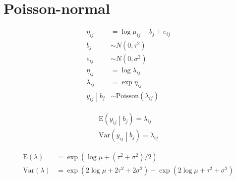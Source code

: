 \documentclass{article}
\begin{document}
\section{Poisson-normal}

\begin{align*}
\eta_{ij} & = \log{\mu_{ij}} + b_j + e_{ij} \\
b_j & \sim N\left(0, \tau^2\right) \\
e_{ij} & \sim N\left(0, \sigma^2\right) \\
\eta_{ij} & = \log{\lambda_{ij}} \\
\lambda_{ij} & = \exp{\eta_{ij}} \\
\left.y_{ij} \middle| b_j\right. & \sim \text{Poisson}\left(\lambda_{ij}\right)
\end{align*}

\begin{align*}
\text{E}\left(y_{ij} \middle| b_j\right) = \lambda_{ij} \\
\text{Var}\left(y_{ij} \middle| b_j\right) = \lambda_{ij}
\end{align*}

\begin{align*}
\text{E}\left(\lambda\right) & = \exp{\left(\log{\mu}+\left(\tau^2+\sigma^2\right) / 2\right)} \\
\text{Var}\left(\lambda\right) & = \exp{\left(2 \log{\mu} + 2\tau^2 + 2\sigma^2\right)} - \exp{\left(2\log{\mu} + \tau^2 +\sigma^2 \right)}
\end{align*}
%
%
\end{document}
